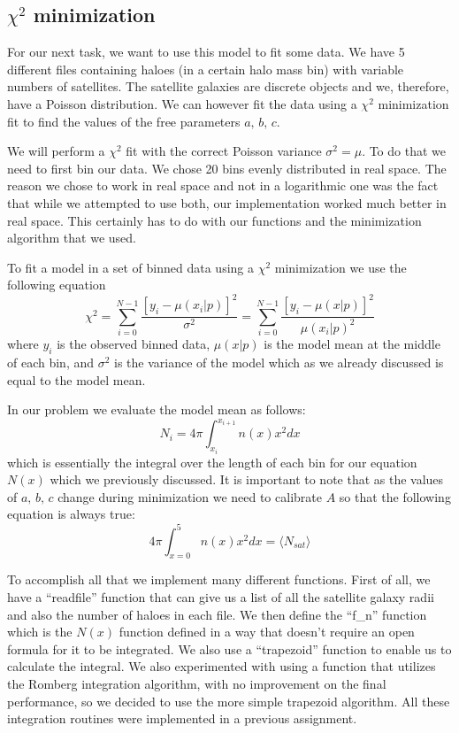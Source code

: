 \documentclass[a4paper,10pt]{article}
\begin{document}
\subsection{$\chi^2$ minimization}
\label{chap:chi}

For our next task, we want to use this model to fit some data. We have 5 different files containing haloes (in a certain halo mass bin) with variable numbers of satellites. The satellite galaxies are discrete objects and we, therefore, have a Poisson distribution. We can however fit the data using a $\chi^2$ minimization fit to find the values of the free parameters $a,\,b,\,c$.

We will perform a $\chi^2$ fit with the correct Poisson variance $\sigma^2 = \mu$. To do that we need to first bin our data. We chose 20 bins evenly distributed in real space. The reason we chose to work in real space and not in a logarithmic one was the fact that while we attempted to use both, our implementation worked much better in real space. This certainly has to do with our functions and the minimization algorithm that we used. 

To fit a model in a set of binned data using a $\chi^2$ minimization we use the following equation
\begin{equation}
  \label{eq:chi2}
  \chi^2 = \sum^{N-1}_{i=0}\frac{[y_i-\mu(x_i|p)]^2}{\sigma^2}=\sum^{N-1}_{i=0}\frac{[y_i-\mu(x|p)]^2}{\mu(x_i|p)^2}
\end{equation}
where $y_i$ is the observed binned data, $\mu(x|p)$ is the model mean at the middle of each bin, and $\sigma^2$ is the variance of the model which as we already discussed is equal to the model mean. 

In our problem we evaluate the model mean as follows:
\begin{equation}
  N_i=4\pi \int^{x_{i+1}}_{x_i} n(x) x^2 dx
\end{equation} 
which is essentially the integral over the length of each bin for our equation $N(x)$ which we previously discussed. It is important to note that as the values of $a,\,b,\,c$ change during minimization we need to calibrate $A$ so that the following equation is always true:
\begin{equation}
  4\pi \int^{5}_{x=0} n(x) x^2 dx = \langle N_{sat} \rangle
\end{equation}

To accomplish all that we implement many different functions. First of all, we have a ``readfile'' function that can give us a list of all the satellite galaxy radii and also the number of haloes in each file. We then define the ``f\_n'' function which is the $N(x)$ function defined in a way that doesn't require an open formula for it to be integrated. We also use a ``trapezoid'' function to enable us to calculate the integral. We also experimented with using a function that utilizes the Romberg integration algorithm, with no improvement on the final performance, so we decided to use the more simple trapezoid algorithm. All these integration routines were implemented in a previous assignment. 
\end{document}

